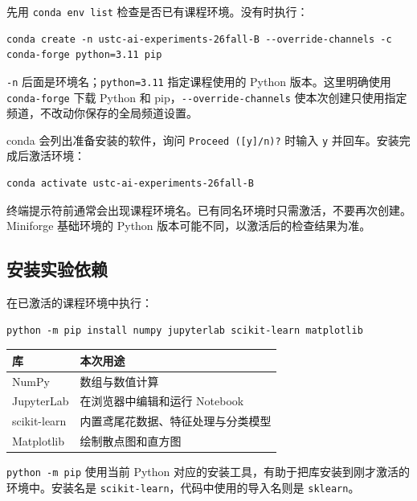 \documentclass[UTF8,a4paper,11pt,fontset=fandol]{ctexart}
\providecommand{\passthrough}[1]{#1}
\begin{document}
先用 \passthrough{\lstinline!conda env list!} 检查是否已有课程环境。没有时执行：

\begin{lstlisting}[language={}]
conda create -n ustc-ai-experiments-26fall-B --override-channels -c conda-forge python=3.11 pip
\end{lstlisting}

\passthrough{\lstinline!-n!} 后面是环境名；\passthrough{\lstinline!python=3.11!} 指定课程使用的 Python 版本。这里明确使用 \passthrough{\lstinline!conda-forge!} 下载 Python 和 pip，\passthrough{\lstinline!--override-channels!} 使本次创建只使用指定频道，不改动你保存的全局频道设置。

conda 会列出准备安装的软件，询问 \passthrough{\lstinline!Proceed ([y]/n)?!} 时输入 \passthrough{\lstinline!y!} 并回车。安装完成后激活环境：

\begin{lstlisting}[language={}]
conda activate ustc-ai-experiments-26fall-B
\end{lstlisting}

终端提示符前通常会出现课程环境名。已有同名环境时只需激活，不要再次创建。Miniforge 基础环境的 Python 版本可能不同，以激活后的检查结果为准。

\subsection{安装实验依赖}\label{ux5b89ux88c5ux5b9eux9a8cux4f9dux8d56}

在已激活的课程环境中执行：

\begin{lstlisting}[language={}]
python -m pip install numpy jupyterlab scikit-learn matplotlib
\end{lstlisting}

\begin{longtable}[]{@{}ll@{}}
\toprule\noalign{}
库 & 本次用途 \\
\midrule\noalign{}
\endhead
\bottomrule\noalign{}
\endlastfoot
NumPy & 数组与数值计算 \\
JupyterLab & 在浏览器中编辑和运行 Notebook \\
scikit-learn & 内置鸢尾花数据、特征处理与分类模型 \\
Matplotlib & 绘制散点图和直方图 \\
\end{longtable}

\passthrough{\lstinline!python -m pip!} 使用当前 Python 对应的安装工具，有助于把库安装到刚才激活的环境中。安装名是 \passthrough{\lstinline!scikit-learn!}，代码中使用的导入名则是 \passthrough{\lstinline!sklearn!}。
\end{document}
